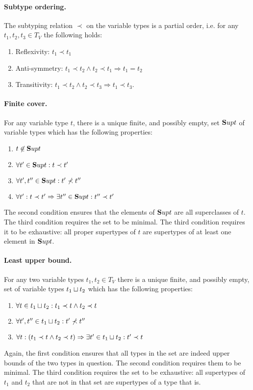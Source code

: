 \paragraph{Subtype ordering.} The subtyping relation $\prec$ on the
variable types is a partial order, i.e. for any $t_1, t_2, t_3 \in
T_V$ the following holds:
\begin{enumerate}
\item Reflexivity: $t_1 \prec t_1$
\item Anti-symmetry: $t_1 \prec t_2 \wedge t_2 \prec t_1 \Longrightarrow t_1 = t_2$
\item Transitivity: $t_1 \prec t_2 \wedge t_2 \prec t_3 \Longrightarrow t_1 \prec t_3$. 
\end{enumerate}

\paragraph{Finite cover.} For any variable type $t$, there is a unique
finite, and possibly empty, set ${\mathbf Sup} t$ of variable types which has
the following properties:
\begin{enumerate}
  \item $t \not \in {\mathbf Sup} t$
  \item $\forall t'\in{\mathbf Sup} t: t \prec t'$
  \item $\forall t', t''\in{\mathbf Sup} t: t'\not\prec t''$
  \item $\forall t' : t \prec t' \Rightarrow \exists t''\in
    {\mathbf Sup} t: t'' \prec t'$
\end{enumerate}
The second condition ensures that the elements of ${\mathbf Sup} t$ are all superclasses of $t$. The third condition requires the set to
be minimal. The third condition requires it to be exhaustive: all
proper supertypes of $t$ are supertypes of at least one element in
${\mathbf Sup} t$.

\paragraph{Least upper bound.} For any two variable types $t_1, t_2\in T_V$
there is a unique finite, and possibly empty, set of variable types
$t_1\sqcup t_2$ which has the following properties:
\begin{enumerate}
  \item $\forall t\in t_1 \sqcup t_2: t_1 \prec t \wedge t_2 \prec t$
  \item $\forall t', t''\in t_1\sqcup t_2: t'\not\prec t''$
  \item $\forall t : (t_1\prec t \wedge t_2\prec t) \Rightarrow
    \exists t' \in t_1 \sqcup t_2: t'\prec t$
\end{enumerate}
Again, the first condition ensures that all types in the set are indeed upper
bounds of the two types in question. The second condition requires
them to be minimal. The third condition requires the set to be
exhaustive: all supertypes of $t_1$ and $t_2$ that are not in that set
are supertypes of a type that is.







